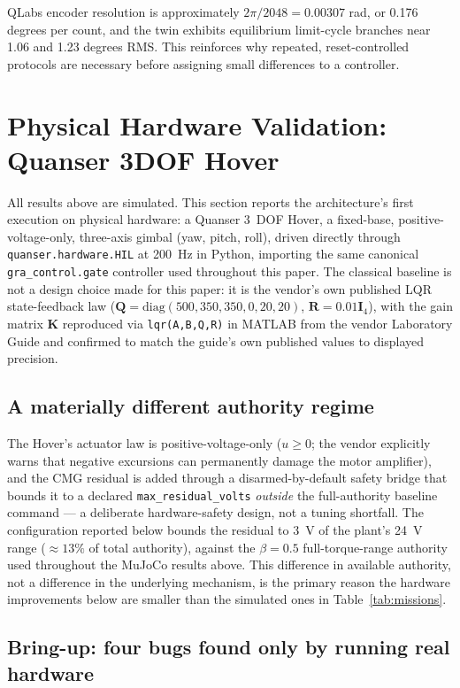 \documentclass[10pt,twocolumn]{article}
\begin{document}
QLabs encoder resolution is approximately $2\pi/2048=0.00307$ rad, or
0.176 degrees per count, and the twin exhibits equilibrium limit-cycle branches
near 1.06 and 1.23 degrees RMS. This reinforces why repeated, reset-controlled
protocols are necessary before assigning small differences to a controller.

\section{Physical Hardware Validation: Quanser 3DOF Hover}
\label{sec:hover-hardware}

All results above are simulated. This section reports the architecture's
first execution on physical hardware: a Quanser 3~DOF Hover, a fixed-base,
positive-voltage-only, three-axis gimbal (yaw, pitch, roll), driven directly
through \texttt{quanser.hardware.HIL} at 200~Hz in Python, importing the same
canonical \texttt{gra\_control.gate} controller used throughout this paper.
The classical baseline is not a design choice made for this paper: it is the
vendor's own published LQR state-feedback law
($\bm Q=\mathrm{diag}(500,350,350,0,20,20)$, $\bm R=0.01\bm I_4$), with the
gain matrix $\bm K$ reproduced via \texttt{lqr(A,B,Q,R)} in MATLAB from the
vendor Laboratory Guide and confirmed to match the guide's own published
values to displayed precision.

\subsection{A materially different authority regime}

The Hover's actuator law is positive-voltage-only
($u\geq0$; the vendor explicitly warns that negative excursions can
permanently damage the motor amplifier), and the CMG residual is added
through a disarmed-by-default safety bridge that bounds it to a declared
\texttt{max\_residual\_volts} \emph{outside} the full-authority baseline
command --- a deliberate hardware-safety design, not a tuning shortfall. The
configuration reported below bounds the residual to 3~V of the plant's 24~V
range ($\approx13\%$ of total authority), against the $\beta=0.5$
full-torque-range authority used throughout the MuJoCo results above. This
difference in available authority, not a difference in the underlying
mechanism, is the primary reason the hardware improvements below are smaller
than the simulated ones in Table~\ref{tab:missions}.

\subsection{Bring-up: four bugs found only by running real hardware}
\end{document}
